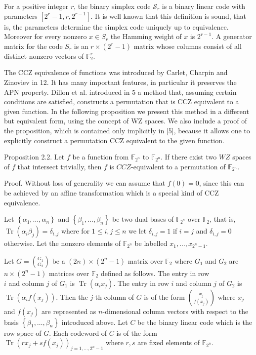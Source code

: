 \documentclass[10pt]{article}
\begin{document}
For a positive integer $r$, the binary simplex code $\mathcal{S}_{r}$ is a binary linear code with parameters $\left[2^{r}-1, r, 2^{r-1}\right]$. It is well known that this definition is sound, that is, the parameters determine the simplex code uniquely up to equivalence. Moreover for every nonzero $x \in S_{r}$ the Hamming weight of $x$ is $2^{r-1}$. A generator matrix for the code $S_{r}$ is an $r \times\left(2^{r}-1\right)$ matrix whose columns consist of all distinct nonzero vectors of $\mathbb{F}_{2}^{r}$.

The CCZ equivalence of functions was introduced by Carlet, Charpin and Zinoviev in 12. It has many important features, in particular it preserves the APN property. Dillon et al. introduced in 5 a method that, assuming certain conditions are satisfied, constructs a permutation that is CCZ equivalent to a given function. In the following proposition we present this method in a different but equivalent form, using the concept of WZ spaces. We also include a proof of the proposition, which is contained only implicitly in [5], because it allows one to explicitly construct a permutation CCZ equivalent to the given function.

Proposition 2.2. Let $f$ be a function from $\mathbb{F}_{2^{n}}$ to $\mathbb{F}_{2^{n}}$. If there exist two $W Z$ spaces of $f$ that intersect trivially, then $f$ is $C C Z$-equivalent to a permutation of $\mathbb{F}_{2^{n}}$.

Proof. Without loss of generality we can assume that $f(0)=0$, since this can be achieved by an affine transformation which is a special kind of CCZ equivalence.

Let $\left\{\alpha_{1}, \ldots, \alpha_{n}\right\}$ and $\left\{\beta_{1}, \ldots, \beta_{n}\right\}$ be two dual bases of $\mathbb{F}_{2^{n}}$ over $\mathbb{F}_{2}$, that is, $\operatorname{Tr}\left(\alpha_{i} \beta_{j}\right)=\delta_{i, j}$ where for $1 \leq i, j \leq n$ we let $\delta_{i, j}=1$ if $i=j$ and $\delta_{i, j}=0$ otherwise. Let the nonzero elements of $\mathbb{F}_{2^{n}}$ be labelled $x_{1}, \ldots, x_{2^{n}-1}$.

Let $G=\binom{G_{1}}{G_{2}}$ be a $(2 n) \times\left(2^{n}-1\right)$ matrix over $\mathbb{F}_{2}$ where $G_{1}$ and $G_{2}$ are $n \times\left(2^{n}-1\right)$ matrices over $\mathbb{F}_{2}$ defined as follows. The entry in row\\
$i$ and column $j$ of $G_{1}$ is $\operatorname{Tr}\left(\alpha_{i} x_{j}\right)$. The entry in row $i$ and column $j$ of $G_{2}$ is $\operatorname{Tr}\left(\alpha_{i} f\left(x_{j}\right)\right)$. Then the $j$-th column of $G$ is of the form $\binom{x_{j}}{f\left(x_{j}\right)}$ where $x_{j}$ and $f\left(x_{j}\right)$ are represented as $n$-dimensional column vectors with respect to the basis $\left\{\beta_{1}, \ldots, \beta_{n}\right\}$ introduced above. Let $C$ be the binary linear code which is the row space of $G$. Each codeword of $C$ is of the form $\operatorname{Tr}\left(r x_{j}+s f\left(x_{j}\right)\right)_{j=1, \ldots, 2^{n}-1}$ where $r, s$ are fixed elements of $\mathbb{F}_{2^{n}}$.
\end{document}
